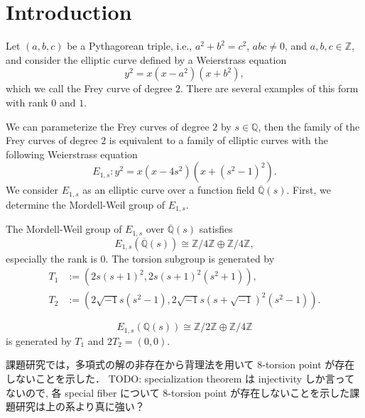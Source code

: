 \documentclass[main]{subfiles}
\begin{document}
\chapter{Introduction}
Let $(a,b,c)$ be a Pythagorean triple, i.e., $a^{2} + b^{2} = c^{2}$, $abc\neq0$, and $a,b,c \in \mathbb{Z}$, and consider the elliptic curve defined by a Weierstrass equation
\begin{equation}
    y^{2} = x(x - a^{2})(x + b^{2}),
\end{equation}
which we call the Frey curve of degree $2$.
There are several examples of this form with rank $0$ and $1$.

We can parameterize the Frey curves of degree $2$ by $s \in \mathbb{Q}$, then the family of the Frey curves of degree $2$ is equivalent to a family of elliptic curves with the following Weierstrass equation
\begin{equation}
    E_{1,s}: y^{2} = x(x - 4s^{2})(x + (s^{2} - 1)^{2}).
\end{equation}
We consider $E_{1,s}$ as an elliptic curve over a function field $\overline{\mathbb{Q}}(s)$.
First, we determine the Mordell-Weil group of $E_{1,s}$.

\begin{thm}
    \label{thm:E_{1,s}}
    The Mordell-Weil group of $E_{1,s}$ over $\overline{\mathbb{Q}}(s)$ satisfies
    \begin{equation}
        E_{1,s}(\overline{\mathbb{Q}}(s)) \cong \mathbb{Z} / 4 \mathbb{Z} \oplus \mathbb{Z} / 4 \mathbb{Z},
    \end{equation}
    especially the rank is $0$. The torsion subgroup is generated by
    \begin{align}
        T_1 & := (2s(s+1)^2, 2s(s+1)^2(s^2+1)),                              \\
        T_2 & := (2 \sqrt{-1} s(s^2-1),2 \sqrt{-1} s(s+\sqrt{-1})^2(s^2-1)).
    \end{align}
\end{thm}

\begin{cor}
    \begin{equation}
        E_{1,s}(\mathbb{Q}(s)) \cong \mathbb{Z} / 2 \mathbb{Z} \oplus \mathbb{Z} / 4 \mathbb{Z}
    \end{equation}
    is generated by $T_1$ and $2T_2=(0,0)$.
\end{cor}

\begin{rem}
    課題研究では，多項式の解の非存在から背理法を用いて 8-torsion point が存在しないことを示した．
    TODO: specialization theorem は injectivity しか言ってないので, 各 special fiber について 8-torsion point が存在しないことを示した課題研究は上の系より真に強い？
\end{rem}
\end{document}
